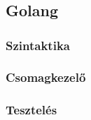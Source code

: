 \chapter{\golang}
\section{Golang}
\subsection{Szintaktika}
\subsection{Csomagkezelő}
\subsection{Tesztelés}